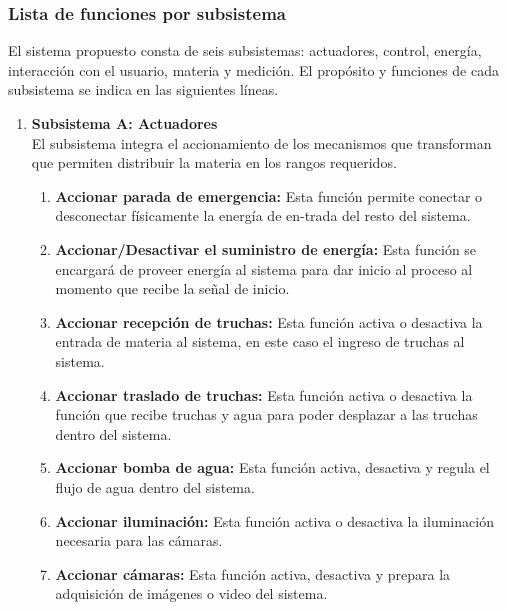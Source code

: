 \newpage
\thispagestyle{fancy}
\subsubsection{Lista de funciones por subsistema}

El sistema propuesto consta de seis subsistemas: actuadores, control, energía, interacción con el usuario, materia y medición. El propósito y funciones de cada subsistema se indica en las siguientes líneas.

\begin{enumerate}
	
	\item \textbf{Subsistema A: Actuadores}\\ El subsistema integra el accionamiento de los mecanismos que transforman que permiten distribuir la materia en los rangos requeridos.
	
	\begin{enumerate}[label=\Alph*)] %
		\item	\textbf{Accionar parada de emergencia:} Esta función permite conectar o desconectar físicamente la energía de en-trada del resto del sistema.
		
		\item	\textbf{Accionar/Desactivar el suministro de energía:} Esta función se encargará de proveer energía al sistema para dar inicio al proceso al momento que recibe la señal de inicio.
		
		\item	\textbf{Accionar recepción de truchas:} Esta función activa o desactiva la entrada de materia al sistema, en este caso el ingreso de truchas al sistema.
		
		\item	\textbf{Accionar traslado de truchas:} Esta función activa o desactiva la función que recibe truchas y agua para poder desplazar a las truchas dentro del sistema.
		
		\item	\textbf{Accionar bomba de agua:} Esta función activa, desactiva y regula el flujo de agua dentro del sistema. 
		
		\item	\textbf{Accionar iluminación:} Esta función activa o desactiva la iluminación necesaria para las cámaras.			
		
		\item	\textbf{Accionar cámaras:} Esta función activa, desactiva y prepara la adquisición de imágenes o video del sistema.
		

\end{enumerate}
\end{enumerate}
